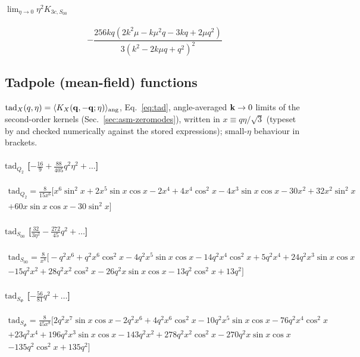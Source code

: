\paragraph{$\lim_{\eta\to0}\eta^2K_{3c,S_{00}}$}
\begin{dmath}
- \frac{256 k q \left(2 k^{2} \mu - k \mu^{2} q - 3 k q + 2 \mu q^{2}\right)}{3 \left(k^{2} - 2 k \mu q + q^{2}\right)^{2}}
\end{dmath}


\subsection{Tadpole (mean-field) functions}
$\mathrm{tad}_X(q,\eta)=\langle K_X(\mathbf q,-\mathbf q;\eta)\rangle_{\rm ang}$, Eq.~\eqref{eq:tad}, angle-averaged $\mathbf k\to0$ limits of the
second-order kernels (Sec.~\ref{sec:asm-zeromodes}), written in $x\equiv q\eta/\sqrt3$ (typeset by  and
checked numerically against the stored expressions); small-$\eta$ behaviour in brackets.

\paragraph{$\mathrm{tad}_{Q_2}$ [$-\tfrac{16}9+\tfrac{88}{405}q^2\eta^2+\ldots$]}
\begin{multline*}
\mathrm{tad}_{Q_2}=\frac{8}{15 x^{6}}\Big[x^{6} \sin^2x+2 x^{5} \sin x \cos x- 2 x^{4}+4 x^{4} \cos^2x- 4 x^{3} \sin x \cos x- 30 x^{2}+32 x^{2} \sin^2x\\
+60 x \sin x \cos x- 30 \sin^2x\Big]
\end{multline*}

\paragraph{$\mathrm{tad}_{S_{00}}$ [$\tfrac{32}{3\eta^2}-\tfrac{272}{45}q^2+\ldots$]}
\begin{multline*}
\mathrm{tad}_{S_{00}}=\frac{8}{x^{8}}\Big[- q^{2} x^{6}+q^{2} x^{6} \cos^2x- 4 q^{2} x^{5} \sin x \cos x- 14 q^{2} x^{4} \cos^2x+5 q^{2} x^{4}+24 q^{2} x^{3} \sin x \cos x\\
- 15 q^{2} x^{2}+28 q^{2} x^{2} \cos^2x- 26 q^{2} x \sin x \cos x- 13 q^{2} \cos^2x+13 q^{2}\Big]
\end{multline*}

\paragraph{$\mathrm{tad}_{S_\Phi}$ [$-\tfrac{56}{81}q^2+\ldots$]}
\begin{multline*}
\mathrm{tad}_{S_\Phi}=\frac{8}{45 x^{8}}\Big[2 q^{2} x^{7} \sin x \cos x- 2 q^{2} x^{6}+4 q^{2} x^{6} \cos^2x- 10 q^{2} x^{5} \sin x \cos x- 76 q^{2} x^{4} \cos^2x\\
+23 q^{2} x^{4}+196 q^{2} x^{3} \sin x \cos x- 143 q^{2} x^{2}+278 q^{2} x^{2} \cos^2x- 270 q^{2} x \sin x \cos x\\
- 135 q^{2} \cos^2x+135 q^{2}\Big]
\end{multline*}

